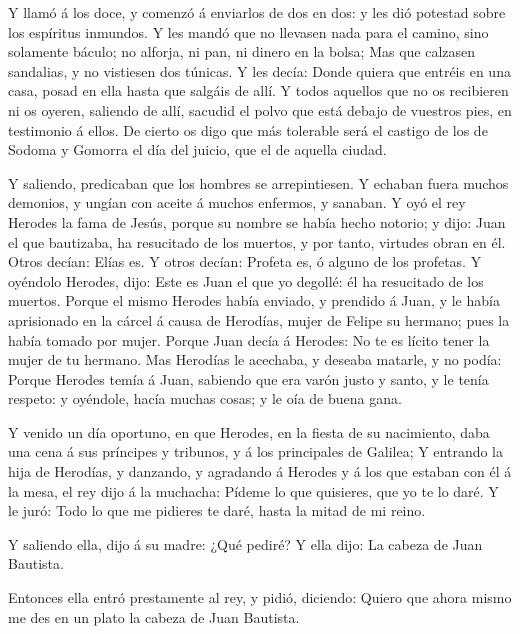  Y llamó á los doce, y comenzó á enviarlos de dos en dos: y
les dió potestad sobre los espíritus inmundos.  Y les mandó
que no llevasen nada para el camino, sino solamente báculo; no alforja,
ni pan, ni dinero en la bolsa;  Mas que calzasen sandalias,
y no vistiesen dos túnicas.  Y les decía: Donde quiera que
entréis en una casa, posad en ella hasta que salgáis de allí.
 Y todos aquellos que no os recibieren ni os oyeren,
saliendo de allí, sacudid el polvo que está debajo de vuestros pies, en
testimonio á ellos. De cierto os digo que más tolerable será el castigo
de los de Sodoma y Gomorra el día del juicio, que el de aquella ciudad.

 Y saliendo, predicaban que los hombres se arrepintiesen.
 Y echaban fuera muchos demonios, y ungían con aceite á
muchos enfermos, y sanaban.  Y oyó el rey Herodes la fama
de Jesús, porque su nombre se había hecho notorio; y dijo: Juan el que
bautizaba, ha resucitado de los muertos, y por tanto, virtudes obran en
él.  Otros decían: Elías es. Y otros decían: Profeta es, ó
alguno de los profetas.  Y oyéndolo Herodes, dijo: Este es
Juan el que yo degollé: él ha resucitado de los muertos. 
Porque el mismo Herodes había enviado, y prendido á Juan, y le había
aprisionado en la cárcel á causa de Herodías, mujer de Felipe su
hermano; pues la había tomado por mujer.  Porque Juan decía
á Herodes: No te es lícito tener la mujer de tu hermano. 
Mas Herodías le acechaba, y deseaba matarle, y no podía: 
Porque Herodes temía á Juan, sabiendo que era varón justo y santo, y le
tenía respeto: y oyéndole, hacía muchas cosas; y le oía de buena gana.

 Y venido un día oportuno, en que Herodes, en la fiesta de
su nacimiento, daba una cena á sus príncipes y tribunos, y á los
principales de Galilea;  Y entrando la hija de Herodías, y
danzando, y agradando á Herodes y á los que estaban con él á la mesa, el
rey dijo á la muchacha: Pídeme lo que quisieres, que yo te lo daré.
 Y le juró: Todo lo que me pidieres te daré, hasta la mitad
de mi reino.

 Y saliendo ella, dijo á su madre: ¿Qué pediré? Y ella
dijo: La cabeza de Juan Bautista.

 Entonces ella entró prestamente al rey, y pidió, diciendo:
Quiero que ahora mismo me des en un plato la cabeza de Juan Bautista.

